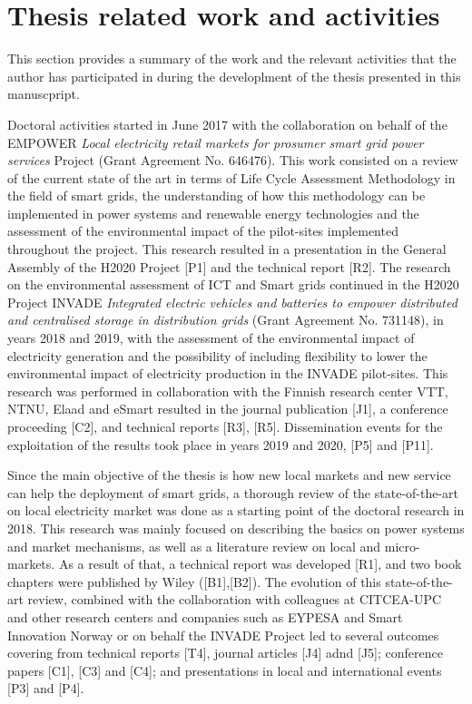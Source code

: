 \newpage 
\section{Thesis related work and activities}
This section provides a summary of the work and the relevant activities that the author has participated in during the developlment of the thesis presented in this manuscpript. 
 	
Doctoral activities started in June 2017 with the collaboration on behalf of the EMPOWER \textit{Local electricity retail markets for prosumer smart grid power services } Project (Grant Agreement No. 646476). This work consisted on a review of the current state of the art in terms of Life Cycle Assessment Methodology in the field of smart grids, the understanding of how this methodology can be implemented in power systems and renewable energy technologies and the assessment of the environmental impact of the pilot-sites implemented throughout the project. This research resulted in a presentation in the General Assembly of the H2020 Project [P1] and the technical report [R2]. The research on the environmental assessment of ICT and Smart grids continued in the H2020 Project INVADE \textit{Integrated electric vehicles and batteries to empower distributed and centralised storage in distribution grids} (Grant Agreement No. 731148), in years  2018 and 2019, with the assessment of the environmental impact of electricity generation and the possibility of including flexibility to lower the environmental impact of electricity production in the INVADE pilot-sites. This research was performed in collaboration with the Finnish research center VTT, NTNU, Elaad and eSmart resulted in the journal publication [J1], a conference proceeding [C2], and technical reports [R3], [R5]. Dissemination events for the exploitation of the results took place in years 2019 and 2020, [P5] and [P11]. 

Since the main objective of the thesis is how new local markets and new service can help the deployment of smart grids, a thorough review of the state-of-the-art on local electricity market was done as a starting point of the doctoral research in 2018. This research was mainly focused on describing the basics on power systems and market mechanisms, as well as a literature review on local and micro-markets. As a result of that, a technical report was developed [R1], and two book chapters were published by Wiley ([B1],[B2]).  The evolution of this state-of-the-art review, combined with the collaboration with colleagues at CITCEA-UPC and other research centers and companies such as EYPESA and Smart Innovation Norway or on behalf the INVADE Project led to several outcomes covering from technical reports [T4], journal articles [J4] adnd [J5]; conference papers [C1], [C3] and [C4]; and presentations in local and international events [P3] and [P4].  

